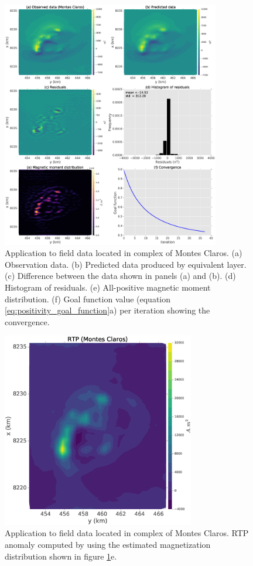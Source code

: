 \begin{figure}
	\centering
	\includegraphics[width=0.85\textwidth]{Fig/field_data_montes_claros/montes_claros_compiled_LM_NNLS_magRM.eps}
	\caption{Application to field data located in complex of Montes Claros. (a) Observation data. (b) Predicted data produced by equivalent layer. (c) Difference between the data shown in panels (a) and (b). (d) Histogram of residuals. (e) All-positive magnetic moment distribution. (f) Goal function value (equation \ref{eq:positivity_goal_function}a) per iteration showing the convergence.}
	\label{fig:mc_data_application}
\end{figure}

\begin{figure}
	\centering
	\includegraphics[width=0.75\textwidth]{Fig/field_data_montes_claros/RTP_data_montes_claros.eps}
	\caption{Application to field data located in complex of Montes Claros. RTP anomaly computed by using the estimated magnetization distribution shown in figure \ref{fig:mc_data_application}e.}
	\label{fig:rtp_mc_data}
\end{figure}
